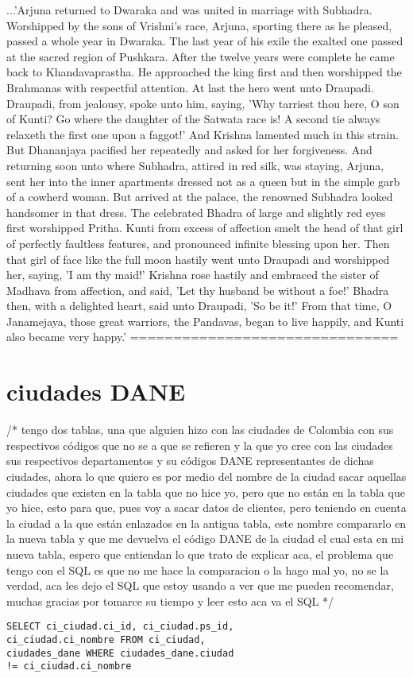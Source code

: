 \documentclass[a1paper]{article}
\begin{document}
\begin{multicols}{7}
{...'Arjuna returned to Dwaraka and was united in marriage
with Subhadra. Worshipped by the sons of Vrishni's race, Arjuna, sporting
there as he pleased, passed a whole year in Dwaraka. The last year of his
exile the exalted one passed at the sacred region of Pushkara. After the
twelve years were complete he came back to Khandavaprastha. He approached
the king first and then worshipped the Brahmanas with respectful
attention. At last the hero went unto Draupadi. Draupadi, from jealousy,
spoke unto him, saying, 'Why tarriest thou here, O son of Kunti? Go where
the daughter of the Satwata race is! A second tie always relaxeth the
first one upon a faggot!' And Krishna lamented much in this strain. But
Dhananjaya pacified her repeatedly and asked for her forgiveness. And
returning soon unto where Subhadra, attired in red silk, was staying,
Arjuna, sent her into the inner apartments dressed not as a queen but in
the simple garb of a cowherd woman. But arrived at the palace, the
renowned Subhadra looked handsomer in that dress. The celebrated Bhadra
of large and slightly red eyes first worshipped Pritha. Kunti from excess
of affection smelt the head of that girl of perfectly faultless features,
and pronounced infinite blessing upon her. Then that girl of face like
the full moon hastily went unto Draupadi and worshipped her, saying, 'I
am thy maid!' Krishna rose hastily and embraced the sister of Madhava
from affection, and said, 'Let thy husband be without a foe!' Bhadra
then, with a delighted heart, said unto Draupadi, 'So be it!' From that
time, O Janamejaya, those great warriors, the Pandavas, began to live
happily, and Kunti also became very happy.'
===============================





\section{ciudades DANE}

/*
tengo dos tablas, una que alguien hizo con las ciudades de Colombia con sus respectivos códigos que no se a que se refieren y la que yo cree con las ciudades sus respectivos departamentos y su códigos DANE representantes de dichas ciudades, ahora lo que quiero es por medio del nombre de la ciudad sacar aquellas ciudades que existen en la tabla que no hice yo, pero que no están en la tabla que yo hice, esto para que, pues voy a sacar datos de clientes, pero teniendo en cuenta la ciudad a la que están enlazados en la antigua tabla, este nombre compararlo en la nueva tabla y que me devuelva el código DANE de la ciudad el cual esta en mi nueva tabla, espero que entiendan lo que trato de explicar aca, el problema que tengo con el SQL es que no me hace la comparacion o la hago mal yo, no se la verdad, aca les dejo el SQL que estoy usando a ver que me pueden recomendar, muchas gracias por tomarce su tiempo y leer esto aca va el SQL 
*/
\begin{verbatim}
SELECT ci_ciudad.ci_id, ci_ciudad.ps_id, 
ci_ciudad.ci_nombre FROM ci_ciudad, 
ciudades_dane WHERE ciudades_dane.ciudad
!= ci_ciudad.ci_nombre
\end{verbatim}

}
\end{multicols}
\end{document}
